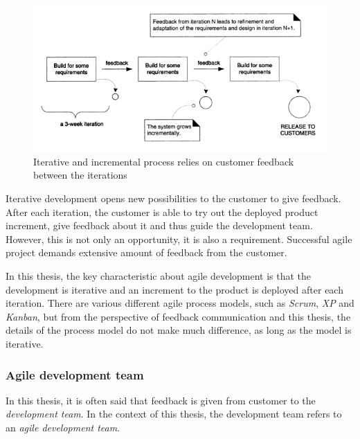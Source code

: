 \documentclass[english,12pt,a4paper,pdftex]{article}
\begin{document}
\begin{figure}[htb]
\begin{center}
\includegraphics[width=1.0\textwidth]{iterative_and_incremental.png}
\end{center}
\caption{Iterative and incremental process relies on customer feedback between the iterations \citep{larman2004}}
\label{fig:iterative_and_incremental}
\end{figure}

Iterative development opens new possibilities to the customer to give feedback. After each iteration, the customer is able to try out the deployed product increment, give feedback about it and thus guide the development team. However, this is not only an opportunity, it is also a requirement. Successful agile project demands extensive amount of feedback from the customer.

In this thesis, the key characteristic about agile development is that the development is iterative and an increment to the product is deployed after each iteration. There are various different agile process models, such as \emph{Scrum}, \emph{\acl{XP}} and \emph{Kanban}, but from the perspective of feedback communication and this thesis, the details of the process model do not make much difference, as long as the model is iterative.

\subsubsection{Agile development team}

In this thesis, it is often said that feedback is given from customer to the \emph{development team}. In the context of this thesis, the development team refers to an \emph{agile development team}. 
\end{document}
